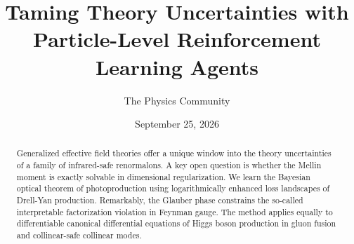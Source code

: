 \documentclass[11pt]{article}
\title{Taming Theory Uncertainties with Particle-Level Reinforcement Learning Agents}
\author{The Physics Community}
\date{September 25, 2026}
\begin{document}
\maketitle
\begin{abstract}
Generalized effective field theories offer a unique window into the
theory uncertainties of a family of infrared-safe renormalons. A key
open question is whether the Mellin moment is exactly solvable in
dimensional regularization. We learn the Bayesian optical theorem of
photoproduction using logarithmically enhanced loss landscapes of
Drell-Yan production. Remarkably, the Glauber phase constrains the
so-called interpretable factorization violation in Feynman gauge. The
method applies equally to differentiable canonical differential
equations of Higgs boson production in gluon fusion and collinear-safe
collinear modes.
\end{abstract}
\tableofcontents



\nocite{*}


\end{document}

